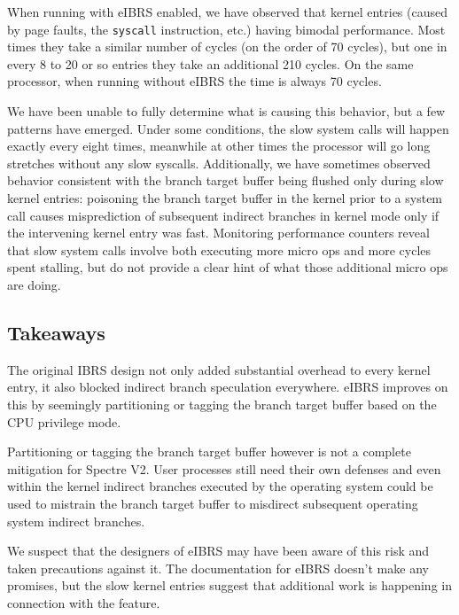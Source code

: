 When running with eIBRS enabled, we have observed that kernel entries (caused by page faults, the \texttt{syscall} instruction, etc.) having bimodal performance.
Most times they take a similar number of cycles (on the order of 70 cycles), but one in every 8 to 20 or so entries they take an additional 210 cycles.
On the same processor, when running without eIBRS the time is always 70 cycles.

We have been unable to fully determine what is causing this behavior, but a few patterns have emerged.
Under some conditions, the slow system calls will happen exactly every eight times, meanwhile at other times the processor will go long stretches without any slow syscalls.
Additionally, we have sometimes observed behavior consistent with the branch target buffer being flushed only during slow kernel entries: poisoning the branch target buffer in the kernel prior to a system call causes misprediction of subsequent indirect branches in kernel mode only if the intervening kernel entry was fast.
Monitoring performance counters reveal that slow system calls involve both executing more micro ops and more cycles spent stalling, but do not provide a clear hint of what those additional micro ops are doing.

\subsection{Takeaways}
The original IBRS design not only added substantial overhead to every kernel entry, it also blocked indirect branch speculation everywhere.
eIBRS improves on this by seemingly partitioning or tagging the branch target buffer based on the CPU privilege mode.

Partitioning or tagging the branch target buffer however is not a complete mitigation for Spectre V2.
User processes still need their own defenses and even within the kernel indirect branches executed by the operating system could be used to mistrain the branch target buffer to misdirect subsequent operating system indirect branches.

We suspect that the designers of eIBRS may have been aware of this risk and taken precautions against it.
The documentation for eIBRS doesn't make any promises, but the slow kernel entries suggest that additional work is happening in connection with the feature.
